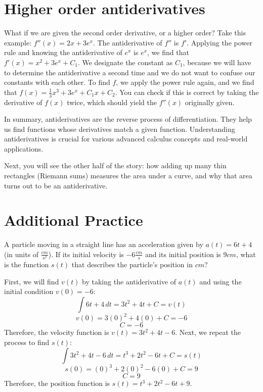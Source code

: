 \section{Higher order antiderivatives}
What if we are given the second order derivative, or a higher order? 
Take this example: $f''(x) = 2x+3e^x$. The antiderivative of $f''$ is 
$f'$. Applying the power rule and knowing the antiderivative of $e^x$ 
is $e^x$, we find that $f'(x) = x^2 + 3e^x + C_1$. We designate the 
constant as $C_1$, because we will have to determine the antiderivative a 
second time and we do not want to confuse our constants with each other.
 To find $f$, we apply the power rule again, and we find that $f(x) = 
\frac{1}{3} x^3 + 3e^x + C_1x + C_2$. You can check if this is correct 
by taking the derivative of $f(x)$ twice, which should yield the 
$f''(x)$ originally given. 

In summary, antiderivatives are the reverse process of
differentiation. They help us find functions whose derivatives match a
given function. Understanding antiderivatives is crucial for various
advanced calculus concepts and real-world applications.

Next, you will see the other half of the story: how adding up many thin
rectangles (Riemann sums) measures the area under a curve, and why that
area turns out to be an antiderivative.

\section{Additional Practice}

\begin{Exercise}[label=antideriv1]
	A particle moving in a straight line has an acceleration given by 
	$a(t) = 6t + 4$ (in units of $\frac{cm}{s^2}$). If its initial 
	velocity is $-6 \frac{cm}{s}$ and its initial position is $9 cm$, 
	what is the function $s(t)$ that describes the particle's position 
	in $cm$?
\end{Exercise}

\begin{Answer}[ref=antideriv1]
	First, we will find $v(t)$ by taking the antiderivative of $a(t)$ and 
	using the initial condition $v(0) = -6$:
	$$\int 6t + 4 \,dt = 3t^2 + 4t + C = v(t)$$
	$$v(0) = 3(0)^2 + 4(0) + C = -6$$
	$$C = -6$$
	Therefore, the velocity function is $v(t) = 3t^2 + 4t - 6$. Next, we 
	repeat the process to find $s(t)$:
	$$\int 3t^2 + 4t - 6 \,dt = t^3 + 2t^2 - 6t + C = s(t)$$
	$$s(0) = (0)^3 + 2(0)^2 - 6(0) + C = 9$$
	$$C = 9$$
	Therefore, the position function is $s(t) = t^3 + 2t^2 - 6t + 9$. 
\end{Answer}

